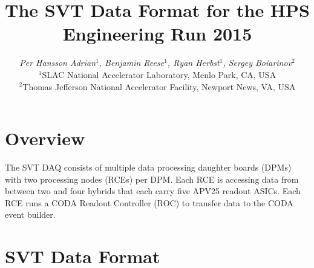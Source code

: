 \documentclass{desyproc}
\begin{document}
\title{The SVT Data Format for the HPS Engineering Run 2015 }

\author{{\slshape Per Hansson Adrian$^1$, Benjamin Reese$^1$, Ryan Herbst$^1$, Sergey Boiarinov$^2$}\\
$^1$SLAC National Accelerator Laboratory, Menlo Park, CA, USA\\
$^2$Thomas Jefferson National Accelerator Facility, Newport News, VA, USA}



\maketitle







\section{Overview}


The SVT DAQ consists of multiple data processing daughter boards (DPMs) with two processing nodes (RCEs) per DPM. 
Each RCE is accessing data from between two and four hybrids that each carry five APV25 readout ASICs. Each RCE 
runs a CODA Readout Controller  (ROC) to transfer data to the CODA event builder. 




\section{SVT Data Format}
\end{document}
